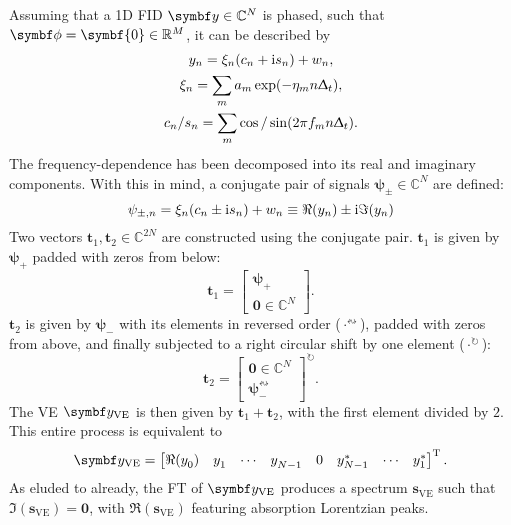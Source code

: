 Assuming that a \ac{1D} \ac{FID} $\by \in \mathbb{C}^N$ is phased, such that
$\bdphi = \symbf{0} \in \mathbb{R}^M$, it can be described by
\begin{subequations}
    \begin{gather}
        y_n = \xi_n (c_n + \mathrm{i} s_n) + w_n,\\
        \xi_n = \sum_m a_m \exp(-\eta_m n \Updelta_t),\\
        c_n / s_n = \sum_m \cos / \sin(2 \pi f_m n \Updelta_t).
    \end{gather}
\end{subequations}
The frequency-dependence has been decomposed into its real and imaginary
components. With this in mind, a conjugate pair of signals $\symbf{\psi}_{\pm}
\in \mathbb{C}^N$ are defined:
\begin{equation}
    \psi_{\pm,n} = \xi_n (c_n \pm \mathrm{i} s_n) + w_n \equiv \Re(y_n) \pm \mathrm{i} \Im(y_n)
\end{equation}
Two vectors $\symbf{t}_{1}, \symbf{t}_2 \in \mathbb{C}^{2N}$
are constructed using the conjugate pair.
$\symbf{t}_1$ is given by $\symbf{\psi}_+$ padded with zeros from below:
    \begin{equation}
        \symbf{t}_1 = \begin{bmatrix}
            \symbf{\psi}_+ \\ \symbf{0} \in \mathbb{C}^{N}
        \end{bmatrix}.
    \end{equation}
$\symbf{t}_2$ is given by $\symbf{\psi}_{-}$ with its elements in
    reversed order ($\cdot^{{\leftrightsquigarrow}}$), padded with zeros
    from above, and finally subjected to a right circular shift by one
    element ($\cdot^{{\circlearrowright}}$):
    \begin{equation}
        \symbf{t}_2 = \begin{bmatrix}
            \symbf{0} \in \mathbb{C}^{N} \\ \symbf{\psi}_-^{{\leftrightsquigarrow}}
    \end{bmatrix}^{{\circlearrowright}}.
   \end{equation}
The \ac{VE} $\by_{\text{VE}}$ is then given by $\symbf{t}_1 +
\symbf{t}_2$, with the first element divided by $2$. This entire process is
equivalent to
\begin{equation}
    \by_{\text{VE}} =
    \begin{bmatrix}
        \Re(y_0^{\vphantom{*}}) &
        y_1^{\vphantom{*}} &
        \cdots &
        y_{N-1}^{\vphantom{*}} &
        0 &
        y_{N-1}^* &
        \cdots &
        y_1^*
    \end{bmatrix}\T.
\end{equation}
As eluded to already, the \ac{FT} of $\by_{\text{VE}}$ produces a spectrum
$\symbf{s}_{\text{VE}}$ such that $\Im\left(\symbf{s}_{\text{VE}}\right) =
\symbf{0}$, with $\Re\left(\symbf{s}_{\text{VE}}\right)$ featuring absorption
Lorentzian peaks.

